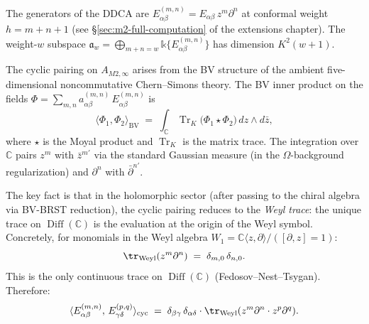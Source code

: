 \documentclass[11pt]{article}
\newcommand{\C}{\mathbb{C}}
\newcommand{\Tr}{\operatorname{Tr}}
\providecommand{\Diff}{\operatorname{Diff}}
\begin{document}
The generators of the DDCA are
$E^{(m,n)}_{\alpha\beta} = E_{\alpha\beta}\, z^m \partial^n$
at conformal weight $h = m + n + 1$ (see
\S\ref{sec:m2-full-computation} of the extensions chapter).  The
weight-$w$ subspace
$\mathfrak{a}_w = \bigoplus_{m+n=w}
\mathbb{k}\{E^{(m,n)}_{\alpha\beta}\}$
has dimension $K^2(w+1)$.

The cyclic pairing on $A_{M2,\infty}$ arises from the BV
structure of the ambient five-dimensional noncommutative
Chern--Simons theory.  The BV inner product on the fields
$\Phi = \sum_{m,n} a^{(m,n)}_{\alpha\beta}\,
E^{(m,n)}_{\alpha\beta}$ is
\begin{equation}\label{eq:m2-bv-pairing}
\langle \Phi_1, \Phi_2 \rangle_{\mathrm{BV}}
\;=\;
\int_{\C} \Tr_K\!\bigl(\Phi_1 \star \Phi_2\bigr)\, dz \wedge d\bar{z},
\end{equation}
where $\star$ is the Moyal product and $\Tr_K$ is the matrix
trace.  The integration over $\C$ pairs $z^m$ with $\bar{z}^{m'}$
via the standard Gaussian measure (in the $\Omega$-background
regularization) and $\partial^n$ with $\bar{\partial}^{n'}$.

The key fact is that in the holomorphic sector (after passing to
the chiral algebra via BV-BRST reduction), the cyclic pairing
reduces to the \emph{Weyl trace}: the unique trace on $\Diff(\C)$
is the evaluation at the origin of the Weyl symbol.  Concretely,
for monomials in the Weyl algebra $W_1 = \C\langle z, \partial
\rangle / ([\partial, z] = 1)$:
\begin{equation}\label{eq:weyl-trace}
\tr_{\mathrm{Weyl}}(z^m \partial^n)
\;=\;
\delta_{m,0}\,\delta_{n,0}.
\end{equation}
This is the only continuous trace on $\Diff(\C)$
(Fedosov--Nest--Tsygan).  Therefore:
\begin{equation}\label{eq:m2-cyclic-pairing}
\langle E^{(m,n)}_{\alpha\beta},\,
E^{(p,q)}_{\gamma\delta} \rangle_{\mathrm{cyc}}
\;=\;
\delta_{\beta\gamma}\,\delta_{\alpha\delta}\cdot
\tr_{\mathrm{Weyl}}(z^m \partial^n \cdot z^p \partial^q).
\end{equation}
\end{document}
